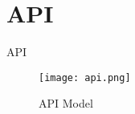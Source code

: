 \section{API}
API

\begin{figure}[h]
    \centering
    \texttt{[image: api.png]}
    \caption{API Model}
    \label{fig::api}
\end{figure}
